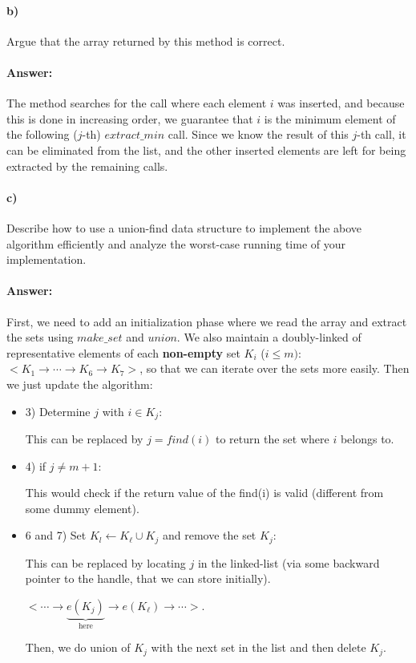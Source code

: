 \documentclass[a4paper]{article}
\begin{document}
\paragraph{b)} Argue that the array returned by this method is correct.

\paragraph{Answer:} The method searches for the call where each element $i$ was inserted, and because this is done in increasing order, we guarantee that $i$ is the minimum element of the following ($j$-th) $extract\_min$ call. Since we know the result of this $j$-th call, it can be eliminated from the list, and the other inserted elements are left for being extracted by the remaining calls.

\paragraph{c)} Describe how to use a union-find data structure to implement the above algorithm efficiently and analyze the worst-case running time of your implementation. 

\paragraph{Answer:} First, we need to add an initialization phase where we read the array and extract the sets using $make\_set$ and $union$. We also maintain a doubly-linked of representative elements of each \textbf{non-empty} set $K_i$ ($i \le m)$: $<K_1 \rightarrow \cdots \rightarrow K_6  \rightarrow K_7>$, so that we can iterate over the sets more easily. Then we just update the algorithm:

\begin{itemize}
\item 3) Determine $j$ with $i \in K_j$:

This can be replaced by $j = find(i)$ to return the set where $i$ belongs to.

\item 4) if $j \neq m+1$:

This would check if the return value of the find(i) is valid (different from some dummy element).

\item 6 and 7) Set $K_l \gets K_\ell \cup K_j$ and remove the set $K_j$:

This can be replaced by locating $j$ in the linked-list (via some backward pointer to the handle, that we can store initially).

$<\cdots \rightarrow \underbrace{e(K_j)}_\text{here} \rightarrow e(K_\ell) \rightarrow \cdots>$.

Then, we do union of $K_j$ with the next set in the list and then delete $K_j$.

\end{itemize}
\end{document}

